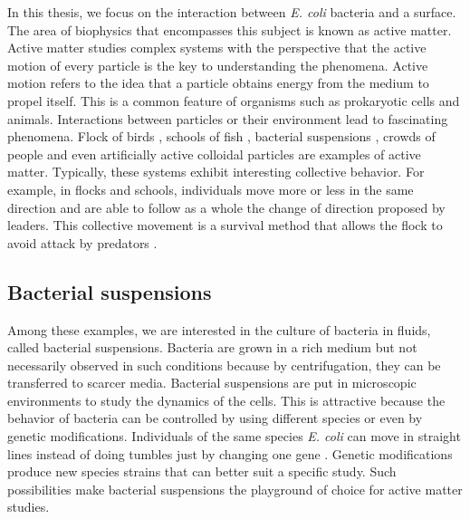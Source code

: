 In this thesis, we focus on the interaction between \textit{E. coli} bacteria and a surface. The area of biophysics that encompasses this subject is known as active matter. Active matter studies complex systems with the perspective that the active motion of every particle is the key to understanding the phenomena. Active motion refers to the idea that a particle obtains energy from the medium to propel itself. This is a common feature of organisms such as prokaryotic cells and animals. Interactions between particles or their environment lead to fascinating phenomena. Flock of birds \cite{Bialek2012StatisticalBirds,Cavagna2015FlockingMotion}, schools of fish \cite{Toner1998FlocksFlocking}, bacterial suspensions \cite{Lopez2015TurningSuperfluids, Clement2016BacterialFlow,Vincenti2019MagnetotacticMotor}, crowds of people \cite{Faria2010LeadershipCrowds} and even artificially active colloidal particles \cite{Zhang2018Light-controlledParticles, Jiang2020PickeringApplications} are examples of active matter. Typically, these systems exhibit interesting collective behavior. For example, in flocks and schools, individuals move more or less in the same direction and are able to follow as a whole the change of direction proposed by leaders. This collective movement is a survival method that allows the flock to avoid attack by predators \cite{Bialek2012StatisticalBirds,Cavagna2015FlockingMotion}.



\subsection{Bacterial suspensions}

Among these examples, we are interested in the culture of bacteria in fluids, called bacterial suspensions. Bacteria are grown in a rich medium but not necessarily observed in such conditions because by centrifugation, they can be transferred to scarcer media. Bacterial suspensions are put in microscopic environments to study the dynamics of the cells. This is attractive because the behavior of bacteria can be controlled by using different species or even by genetic modifications. Individuals of the same species \textit{E. coli} can move in straight lines instead of doing tumbles just by changing one gene \cite{VanVliet2014ThePopulations}. Genetic modifications produce new species strains that can better suit a specific study. Such possibilities make bacterial suspensions the playground of choice for active matter studies.

